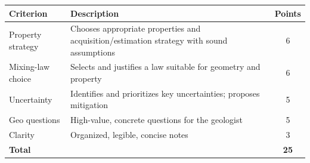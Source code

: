 \documentclass[11pt,a4paper]{article}
\begin{document}
\vspace{0.5em}
\begin{tabularx}{\linewidth}{@{}lXc@{}}
\toprule
Criterion & Description & Points \\
\midrule
Property strategy & Chooses appropriate properties and acquisition/estimation strategy with sound assumptions & 6 \\
Mixing-law choice & Selects and justifies a law suitable for geometry and property & 6 \\
Uncertainty & Identifies and prioritizes key uncertainties; proposes mitigation & 5 \\
Geo questions & High-value, concrete questions for the geologist & 5 \\
Clarity & Organized, legible, concise notes & 3 \\
\midrule
\textbf{Total} &  & \textbf{25} \\
\bottomrule
\end{tabularx}
\end{document}
